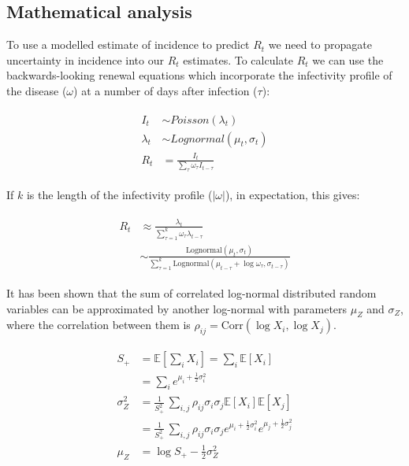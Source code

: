 \documentclass[10pt,letterpaper]{article}
\begin{document}
\subsection*{Mathematical analysis}

To use a modelled estimate of incidence to predict $R_t$ we need to propagate uncertainty in incidence into our $R_t$ estimates. To calculate $R_t$ we can use the backwards-looking renewal equations \cite{gostic2020} which incorporate the infectivity profile of the disease ($\omega$) at a number of days after infection ($\tau$):

\begin{eqnarray}
\begin{aligned}
I_t &\sim Poisson(\lambda_t) \\
\lambda_t &\sim Lognormal(\mu_t,\sigma_t) \\
R_t &= \frac{I_t}{\sum_{\tau}{\omega_{\tau}I_{t-\tau}}}
\end{aligned}
\end{eqnarray}

If $k$ is the length of the infectivity profile ($|\omega|$), in expectation, this gives:

\begin{eqnarray}
\begin{aligned}
R_t &\approx \frac{\lambda_t}{\sum_{\tau=1}^{k} \omega_\tau \lambda_{t-\tau}} \\
&\sim \frac{\text{Lognormal}(\mu_t, \sigma_t)}{\sum_{\tau=1}^{k} \text{Lognormal}\left( \mu_{t-\tau} + \log \omega_\tau, \sigma_{t-\tau} \right)}
\end{aligned}
\label{eq:renew}
\end{eqnarray}

It has been shown that the sum of correlated log-normal distributed random variables can be approximated by another log-normal \cite{lo2013} with parameters $\mu_Z$ and $\sigma_Z$, where the correlation between them is $\rho_{ij} = \text{Corr}(\log X_i, \log X_j)$.

\begin{eqnarray}
\begin{aligned}
	S_+ &= \mathbb{E}\left[\sum_i X_i \right] = \sum_i
	\mathbb{E}[X_i] \\
	&= \sum_i e^{\mu_i + \frac{1}{2}\sigma_i^2}
	\\
	\sigma^2_{Z} &= \frac{1}{S_+^2} \, \sum_{i,j}
	  \rho_{ij} \sigma_i \sigma_j \mathbb{E}[X_i] \mathbb{E}[X_j] \\
	  &= \frac{1}{S_+^2} \, \sum_{i,j}
	  \rho_{ij} \sigma_i \sigma_j e^{\mu_i+\frac{1}{2}\sigma_i^2}
	  e^{\mu_j+\frac{1}{2}\sigma_j^2}
	\\
	\mu_Z &= \log S_+ - \frac{1}{2}\sigma_{Z}^2
\end{aligned}
\label{eq:lo}
\end{eqnarray}
\end{document}
